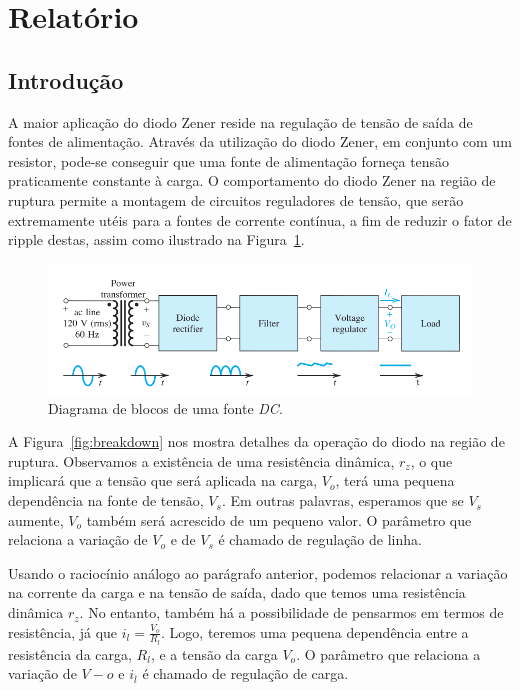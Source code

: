 \documentclass[12pt,a4paper]{article}
\begin{document}
\setcounter{figure}{4}
\setcounter{section}{3}
\setcounter{page}{5}
\section{Relatório}
\subsection{Introdução}
A maior aplicação do diodo Zener reside na regulação de tensão de saída de fontes de alimentação. Através da utilização do diodo Zener, em conjunto com um resistor, pode-se conseguir que uma fonte de alimentação forneça tensão praticamente constante à carga. O comportamento do diodo Zener na região de ruptura permite a montagem de circuitos reguladores de tensão, que serão extremamente utéis para a fontes de corrente contínua, a fim de reduzir o fator de ripple destas, assim como ilustrado na Figura~\ref{fig:esquema_tensao}.

\begin{figure}[htpb]
  \centering
  \includegraphics[width=0.8\linewidth]{./blocotransformador.pdf}
  \caption{Diagrama de blocos de uma fonte \emph{DC}.}
  \label{fig:esquema_tensao}
\end{figure}
A Figura~\ref{fig:breakdown} nos mostra detalhes da operação do diodo na região de ruptura. Observamos a existência de uma resistência dinâmica, $r_z$, o que implicará que a tensão que será aplicada na carga, $V_o$, terá uma pequena dependência na fonte de tensão, $V_s$. Em outras palavras, esperamos que se $V_s$ aumente, $V_o$ também será acrescido de um pequeno valor. O parâmetro que relaciona a variação de $V_o$ e de $V_s$ é chamado de regulação de linha.

Usando o raciocínio análogo ao parágrafo anterior, podemos relacionar a variação na  corrente da carga e na tensão de saída, dado que temos uma resistência dinâmica $r_z$. No entanto, também há a possibilidade de pensarmos em termos de resistência, já que $i_l= \frac{V_o}{R_l}$. Logo, teremos uma pequena dependência entre a resistência da carga, $R_l$, e a tensão da carga $V_o$. O parâmetro que relaciona a variação de $V-o$ e $i_l$ é chamado de regulação de carga. 
\end{document}
